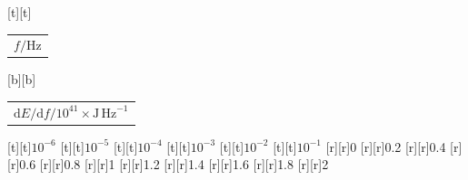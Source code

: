 %    
%
%
\begin{psfrags}%
\psfragscanon%
%
[t][t]{\color[rgb]{0,0,0}\setlength{\tabcolsep}{0pt}\begin{tabular}{c}$f/\mathrm{Hz}$\end{tabular}}%
[b][b]{\color[rgb]{0,0,0}\setlength{\tabcolsep}{0pt}\begin{tabular}{c}$\mathrm{d}E/\mathrm{d}{f}/10^{41} \times \mathrm{J\,Hz}^{-1}$\end{tabular}}%
%
[t][t]{$10^{-6}$}%
[t][t]{$10^{-5}$}%
[t][t]{$10^{-4}$}%
[t][t]{$10^{-3}$}%
[t][t]{$10^{-2}$}%
[t][t]{$10^{-1}$}%
%
[r][r]{0}%
[r][r]{0.2}%
[r][r]{0.4}%
[r][r]{0.6}%
[r][r]{0.8}%
[r][r]{1}%
[r][r]{1.2}%
[r][r]{1.4}%
[r][r]{1.6}%
[r][r]{1.8}%
[r][r]{2}%
%
%
\end{psfrags}%
%
